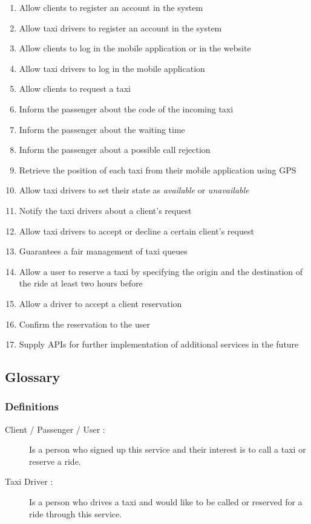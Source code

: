 \documentclass[a4paper]{article}
\begin{document}
\begin{enumerate}[label=\bfseries G\arabic*:]
\item Allow clients to register an account in the system
\item Allow taxi drivers to register an account in the system
\item Allow clients to log in the mobile application or in the website
\item Allow taxi drivers to log in the mobile application
\item Allow clients to request a taxi
\item Inform the passenger about the code of the incoming taxi
\item Inform the passenger about the waiting time
\item Inform the passenger about a possible call rejection
\item Retrieve the position of each taxi from their mobile application using GPS
\item Allow taxi drivers to set their state as \emph{available} or \emph{unavailable}
\item Notify the taxi drivers about a client's request
\item Allow taxi drivers to accept or decline a certain client's request
\item Guarantees a fair management of taxi queues
\item Allow a user to reserve a taxi by specifying the origin and the destination of the ride at least two hours before
\item Allow a driver to accept a client reservation
\item Confirm the reservation to the user
\item Supply APIs for further implementation of additional services in the future
\end{enumerate}

\subsection{Glossary}
\subsubsection{Definitions}
\begin{description}
\item[Client / Passenger / User :] Is a person who signed up this service and their interest is to call a taxi or reserve  a ride.
\item[Taxi Driver :] Is a person who drives a taxi and would like to be called or reserved for a ride through this service.
\end{description}
\end{document}
